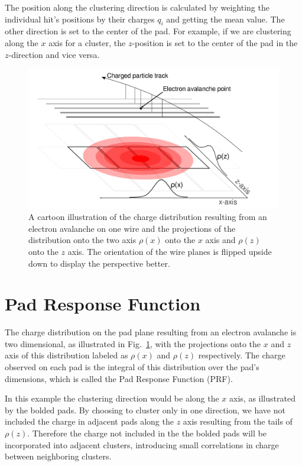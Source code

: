 \documentclass[review,number,sort&compress]{elsarticle}
\begin{document}
 The position along the clustering direction is calculated by weighting the individual hit's positions by their charges $q_i$ and getting the mean value. The other direction is set to the center of the pad. For example, if we are clustering along the $x$ axis for a cluster, the $z$-position is set to the center of the pad in the $z$-direction and vice versa. 
 


\begin{figure}[ht!]
\includegraphics[width=\linewidth]{fig4}
\caption{A cartoon illustration of the charge distribution resulting from an electron avalanche on one wire and the projections of the distribution onto the two axis $\rho(x)$ onto the $x$ axis and $\rho(z)$ onto the $z$ axis. The orientation of the wire planes is flipped upside down to display the perspective better.}
\label{fig:prf}
\end{figure}

\section{Pad Response Function}
The charge distribution on the pad plane resulting from an electron avalanche is two dimensional, as illustrated in Fig.~\ref{fig:prf}, with the projections onto the $x$ and $z$ axis of this distribution labeled as $\rho(x)$ and $\rho(z)$ respectively. The charge observed on each pad is the integral of this distribution over the pad's dimensions, which is called the Pad Response Function (PRF).

In this example the clustering direction would be along the $x$ axis, as illustrated by the bolded pads. By choosing to cluster only in one direction, we have not included the charge in adjacent pads along the $z$ axis resulting from the tails of $\rho(z)$. Therefore the charge not included in the the bolded pads will be incorporated into adjacent clusters, introducing small correlations in charge between neighboring clusters. 
\end{document}
